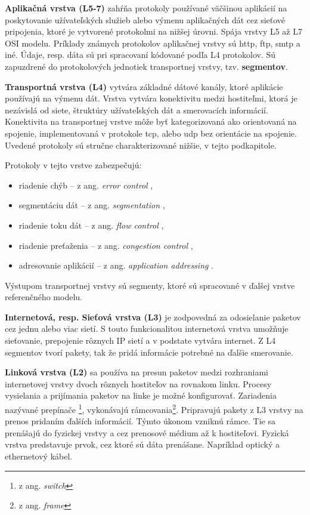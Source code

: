 \textbf{Aplikačná vrstva (L5-7)} zahŕňa protokoly používané väčšinou aplikácií na poskytovanie užívateľských služieb alebo výmenu aplikačných dát cez sieťové pripojenia, ktoré je vytvorené protokolmi na nižšej úrovni.  Spája vrstvy L5 až L7 OSI modelu. Príklady známych protokolov aplikačnej vrstvy sú \acrfull{http}, \acrfull{ftp}, \acrfull{smtp} a iné. Údaje, resp. dáta sú pri spracovaní kódované podľa L4 protokolov. Sú zapuzdrené do protokolových jednotiek transportnej vrstvy, tzv. \textbf{segmentov}.  

\textbf{Transportná vrstva (L4)} vytvára základné dátové kanály, ktoré aplikácie používajú na výmenu dát. Vrstva vytvára konektivitu medzi hostiteľmi, ktorá je nezávislá od siete, štruktúry užívateľských dát a smerovacích informácií. Konektivita na transportnej vrstve môže byť kategorizovaná ako orientovaná na spojenie, implementovaná v protokole \acrshort{tcp}, alebo \acrshort{udp} bez orientácie na spojenie. Uvedené protokoly sú stručne charakterizované nižšie, v tejto podkapitole. 

Protokoly v tejto vrstve zabezpečujú:
\begin{itemize}
	\item{riadenie chýb} -- z ang. \textit{error control} \cite{ec},
	\item{segmentáciu dát} -- z ang. \textit{segmentation} \cite{sd},
	\item{riadenie toku dát} -- z ang. \textit{flow control} \cite{fc},
	\item{riadenie preťaženia} -- z ang. \textit{congestion control} \cite{cc},
	\item{adresovanie aplikácií} -- z ang. \textit{application addressing} \cite{aa}.
\end{itemize}
Výstupom transportnej vrstvy sú segmenty, ktoré sú spracované v ďalšej vrstve referenčného modelu. 

\textbf{Internetová, resp. Sieťová vrstva (L3)} je zodpovedná za odosielanie paketov cez jednu alebo viac sietí. S touto funkcionalitou internetová vrstva umožňuje sieťovanie, prepojenie rôznych IP sietí a v podstate vytvára internet. Z L4 segmentov tvorí pakety, tak že pridá informácie potrebné na ďalšie smerovanie. 

\textbf{Linková vrstva (L2)} sa používa na presun paketov medzi rozhraniami internetovej vrstvy dvoch rôznych hostiteľov na rovnakom linku. Procesy vysielania a prijímania paketov na linke je možné konfigurovať. Zariadenia nazývané prepínače \footnote{z ang. \textit{switch}}, vykonávajú rámcovania\footnote{z ang. \textit{frame}}. Pripravujú pakety z L3 vrstvy na prenos pridaním ďalších informácií. Týmto úkonom vzniknú rámce. Tie sa prenášajú do fyzickej vrstvy a cez prenosové médium až k hostiteľovi. Fyzická vrstva predstavuje prvok, cez ktoré sú dáta prenášane. Napríklad optický a ethernetový kábel. 

